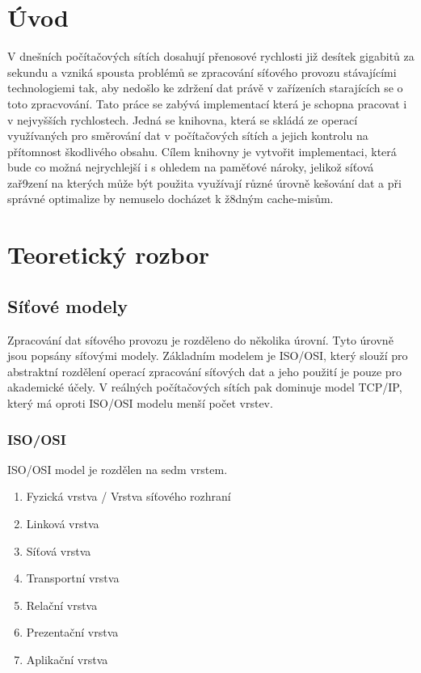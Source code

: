 
\chapter{Úvod}
V dnešních počítačových sítích dosahují přenosové rychlosti již desítek gigabitů za sekundu
a vzniká spousta problémů se zpracování síťového provozu stávajícími technologiemi tak,
 aby nedošlo ke zdržení dat právě v zařízeních starajících se o toto zpracvování.
Tato práce se zabývá implementací která je schopna pracovat i v nejvyšších rychlostech.
Jedná se knihovna, která se skládá ze operací využívaných pro směrování dat v počítačových sítích
a jejich kontrolu na přítomnost škodlivého obsahu. Cílem knihovny je vytvořit implementaci, která bude
co možná nejrychlejší i s ohledem na paměťové nároky, jelikož síťová zař9zení na kterých může být použita
využívají různé úrovně kešování dat a při správné optimalize by nemuselo docházet k ž8dným cache-misům.
\chapter{Teoretický rozbor}
\section{Síťové modely}

Zpracování dat síťového provozu je rozděleno do několika úrovní. Tyto úrovně jsou popsány síťovými modely.
Základním modelem je ISO/OSI, který slouží pro abstraktní rozdělení operací zpracování síťových dat a jeho použití je
pouze pro akademické účely. V reálných počítačových sítích pak dominuje model TCP/IP, který má oproti
ISO/OSI modelu menší počet vrstev.

\subsection{ISO/OSI}
ISO/OSI model je rozdělen na sedm vrstem.

\begin{enumerate}
	\item{Fyzická vrstva / Vrstva síťového rozhraní}
	\item{Linková vrstva}
	\item{Síťová vrstva}
	\item{Transportní vrstva}
	\item{Relační vrstva}
	\item{Prezentační vrstva}
	\item{Aplikační vrstva}
\end{enumerate}

